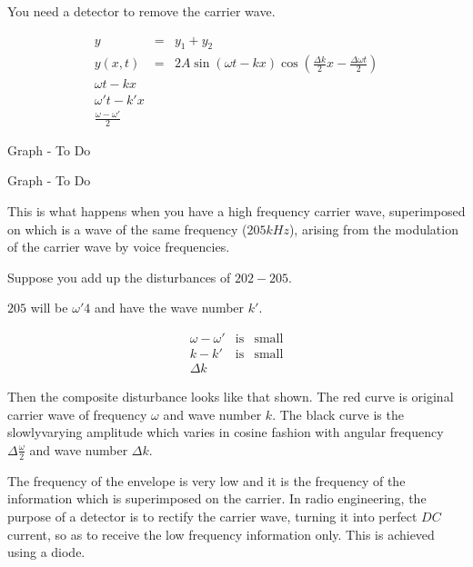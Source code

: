 \documentclass[a4paper,12pt]{article}
\begin{document}
You need a detector to remove the carrier wave.


\begin{eqnarray*}
y & = & y_{1} + y_{2} \\
y(x, t) & = & 2 A \sin{\left( \omega t - k x \right)} \cos{\left(
\frac{\Delta k}{2} x - \frac{\Delta \omega t}{2} \right)} \\
\omega t - kx & & \\
\omega' t - k' x & & \\
\frac{\omega - \omega'}{2} & &
\end{eqnarray*}

\begin{table}[hbtp]


Graph - To Do

\end{table}

\begin{table}[hbtp]

Graph - To Do

\end{table}

This is what happens when you have a high frequency carrier wave,
superimposed on which is a wave of the same frequency ($205 kHz$),
arising from the modulation of the carrier wave by voice frequencies.

Suppose you add up the disturbances of $202 - 205$.

$205$ will be $\omega'4$ and have the wave number $k'$.

\begin{eqnarray*}
\omega - \omega' & \mbox{is} & \mbox{small} \\
k - k' & \mbox{is} & \mbox{small} \\
\Delta k & &
\end{eqnarray*}

Then the composite disturbance looks like that shown. The red curve is
original carrier wave of frequency $\omega$ and wave number $k$. The
black curve is the slowlyvarying amplitude which varies in cosine
fashion with angular frequency $\Delta \frac{\omega}{2}$ and wave number
$\Delta k$.

The frequency of the envelope is very low and it is the frequency of the
information which is superimposed on the carrier. In radio engineering,
the purpose of a detector is to rectify the carrier wave, turning it
into perfect $DC$ current, so as to receive the low frequency
information only. This is achieved using a diode.
\end{document}
